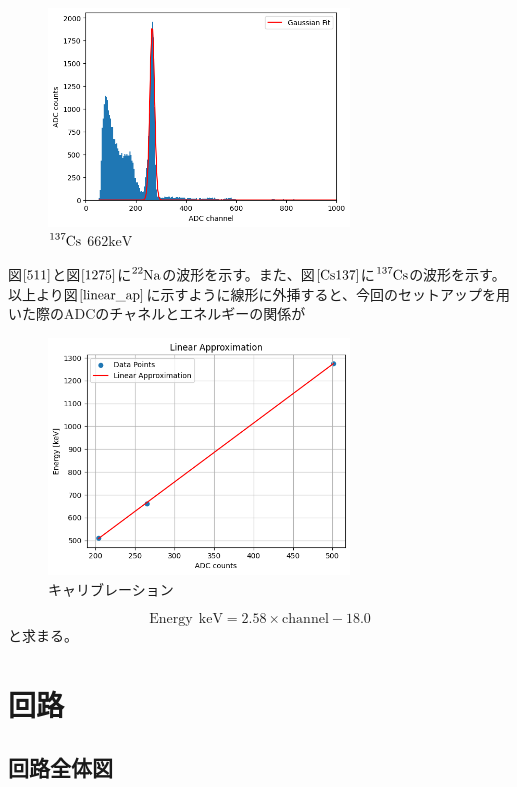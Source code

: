 \documentclass[dvipdfmx]{jreport}
\begin{document}
\begin{figure}[htbp]
  \centering
  \includegraphics[width=80mm]{figure/Cs137_10min.png}
  \caption{$\ce{^{137}Cs}$ $662\mathrm{keV}$ \label{Cs137}}
\end{figure}
図$\ref{511}$と図$\ref{1275}$に$\ce{^{22}Na}$の波形を示す。また、図$\ref{Cs137}$に$\ce{^{137}Cs}$の波形を示す。
以上より図$\ref{linear_ap}$に示すように線形に外挿すると、今回のセットアップを用いた際のADCのチャネルとエネルギーの関係が
\begin{figure}[htbp]
  \centering
  \includegraphics[width=80mm]{figure/linear_ap.png}
  \caption{キャリブレーション\label{linear_ap}}
\end{figure}
\begin{equation}
  \mathrm{Energy\ \ keV} = 2.58 \times \mathrm{channel} - 18.0
\end{equation}
と求まる。

\section{回路}

\subsection{回路全体図}
\end{document}
